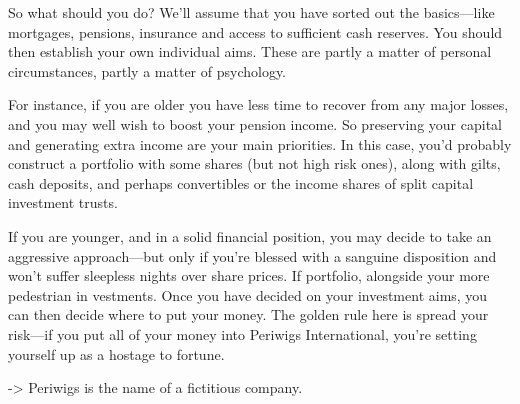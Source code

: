 \documentclass[11pt]{article}
\begin{document}
So what should you do? We'll assume that you have sorted out the basics---like mortgages, pensions, insurance and access to sufficient cash reserves. You should then establish your own individual aims. These are partly a matter of personal circumstances, partly a matter of psychology.

For instance, if you are older you have less time to recover from any major losses, and you may well wish to boost your pension income. So preserving your capital and generating extra income are your main priorities. In this case, you'd probably construct a portfolio with some shares (but not high risk ones), along with gilts, cash deposits, and perhaps convertibles or the income shares of split capital investment trusts.

If you are younger, and in a solid financial position, you may decide to take an aggressive approach---but only if you're blessed with a sanguine disposition and won't suffer sleepless nights over share prices. If portfolio, alongside your more pedestrian in vestments. Once you have decided on your investment aims, you can then decide where to put your money. The golden rule here is spread your risk---if you put all of your money into Periwigs International, you're setting yourself up as a hostage to fortune.

-> Periwigs is the name of a fictitious company.
\end{document}
